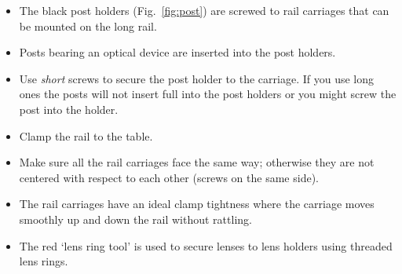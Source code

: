 \documentclass[a4paper]{report}
\begin{document}
	\begin{itemize}
	\item The black post holders (Fig.~\ref{fig:post}) are screwed to rail carriages that can be mounted on the long rail.
	\item Posts bearing an optical device are inserted into the post holders. 
	\item Use \textit{short} screws to secure the post holder to the carriage. If you use long ones the posts will not insert full into the post holders or you might screw the post into the holder.  
	\item Clamp the rail to the table.
	\item  Make sure all the rail carriages face the same way; otherwise they are not centered with respect to each other (screws on the same side).
        \item The rail carriages have an ideal clamp tightness where the carriage moves smoothly up and down the rail without rattling. 
	\item The red `lens ring tool' is used to secure lenses to lens holders using threaded lens rings. 
	\end{itemize}
	
\end{document}
